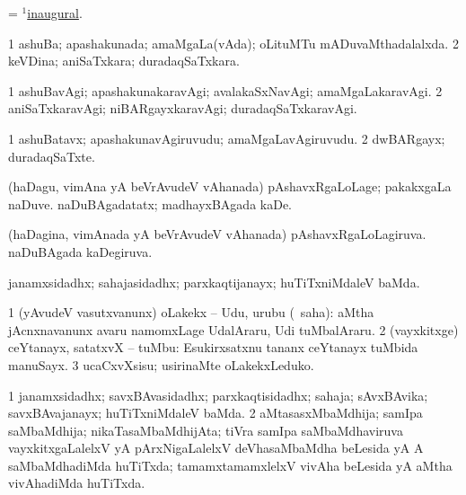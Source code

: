 \bentry
{}
\gl{\gu}
\bmng
 = \hyperlink{inaugural(1)}{$^1$inaugural}. 
\emng
\eentry

\bentry
{}
\gl{\gu}
\bmng
\bnum
\num{1} ashuBa; apashakunada; amaMgaLa(vAda); oLituMTu mADuvaMthadalalxda. 
\num{2} keVDina; aniSaTxkara; duradaqSaTxkara. 
\enum
\emng
\eentry

\bentry
{}
\gl{\kirxvi}
\bmng
\bnum
\num{1} ashuBavAgi; apashakunakaravAgi; avalakaSxNavAgi; amaMgaLakaravAgi. 
\num{2} aniSaTxkaravAgi; niBARgayxkaravAgi; duradaqSaTxkaravAgi. 
\enum
\emng
\eentry

\bentry
{}
\gl{\nA}
\bmng
\bnum
\num{1} ashuBatavx; apashakunavAgiruvudu; amaMgaLavAgiruvudu. 
\num{2} dwBARgayx; duradaqSaTxte. 
\enum
\emng
\eentry

\bentry
{}
\gl{\kirxvi}
\bmng
(haDagu, vimAna yA beVrAvudeV vAhanada) 
\banum
{} pAshavxRgaLoLage; pakakxgaLa naDuve. 
 naDuBAgadatatx; madhayxBAgada kaDe. 
\eanum
\emng
\eentry

\bentry
{}
\gl{\gu}
\bmng
(haDagina, vimAnada yA beVrAvudeV vAhanada) 
\banum
{} pAshavxRgaLoLagiruva. 
 naDuBAgada kaDegiruva. 
\eanum
\emng
\eentry

\bentry
{}
\gl{\gu}
\bmng
janamxsidadhx; sahajasidadhx; parxkaqtijanayx; huTiTxniMdaleV baMda. 
\emng
\eentry

\bentry
{}
\gl{\sakirx}
\bmng
\bnum
\num{1} (yAvudeV vasutxvanunx) oLakekx -- Udu, urubu (\rUpa\ saha):  aMtha jAcnxnavanunx avaru namomxLage UdalAraru, Udi tuMbalAraru. 
\num{2} (vayxkitxge) ceYtanayx, satatxvX -- tuMbu:  Esukirxsatxnu tananx ceYtanayx tuMbida manuSayx. 
\num{3} ucaCxvXsisu; usirinaMte oLakekxLeduko. 
\enum
\emng
\eentry

\bentry
{}
\gl{\gu}
\bmng
\bnum
\num{1} janamxsidadhx; savxBAvasidadhx; parxkaqtisidadhx; sahaja; sAvxBAvika; savxBAvajanayx; huTiTxniMdaleV baMda. 
\num{2} aMtasasxMbaMdhija; samIpa saMbaMdhija; nikaTasaMbaMdhijAta; tiVra samIpa saMbaMdhaviruva vayxkitxgaLalelxV yA pArxNigaLalelxV deVhasaMbaMdha beLesida yA A saMbaMdhadiMda huTiTxda; tamamxtamamxlelxV vivAha beLesida yA aMtha vivAhadiMda huTiTxda. 
\enum
\emng
\eentry

